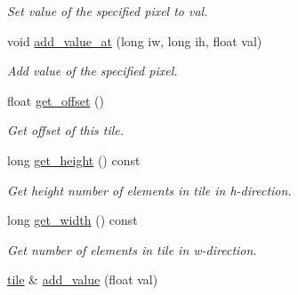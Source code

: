 \begin{DoxyCompactItemize}
\begin{DoxyCompactList}\small\item\em Set value of the specified pixel to val. \end{DoxyCompactList}\item 
\hypertarget{classtile_a98ed93611772f6a3d36e8200c5cfb7ae}{void \hyperlink{classtile_a98ed93611772f6a3d36e8200c5cfb7ae}{add\-\_\-value\-\_\-at} (long iw, long ih, float val)}\label{classtile_a98ed93611772f6a3d36e8200c5cfb7ae}

\begin{DoxyCompactList}\small\item\em Add value of the specified pixel. \end{DoxyCompactList}\item 
\hypertarget{classtile_a3f5a91078193780febf5dac4e506392f}{float \hyperlink{classtile_a3f5a91078193780febf5dac4e506392f}{get\-\_\-offset} ()}\label{classtile_a3f5a91078193780febf5dac4e506392f}

\begin{DoxyCompactList}\small\item\em Get offset of this tile. \end{DoxyCompactList}\item 
\hypertarget{classtile_aa7077bc22ada6ea7e524d9d8e44431a1}{long \hyperlink{classtile_aa7077bc22ada6ea7e524d9d8e44431a1}{get\-\_\-height} () const }\label{classtile_aa7077bc22ada6ea7e524d9d8e44431a1}

\begin{DoxyCompactList}\small\item\em Get height number of elements in tile in h-\/direction. \end{DoxyCompactList}\item 
\hypertarget{classtile_ab17cd2ca85fb73ee40612f543dea083c}{long \hyperlink{classtile_ab17cd2ca85fb73ee40612f543dea083c}{get\-\_\-width} () const }\label{classtile_ab17cd2ca85fb73ee40612f543dea083c}

\begin{DoxyCompactList}\small\item\em Get number of elements in tile in w-\/direction. \end{DoxyCompactList}\item 
\hypertarget{classtile_a6e2f4315c17b62ed2ac5ca2d7d3b01dc}{\hyperlink{classtile}{tile} \& \hyperlink{classtile_a6e2f4315c17b62ed2ac5ca2d7d3b01dc}{add\-\_\-value} (float val)}\label{classtile_a6e2f4315c17b62ed2ac5ca2d7d3b01dc}


\end{DoxyCompactItemize}

